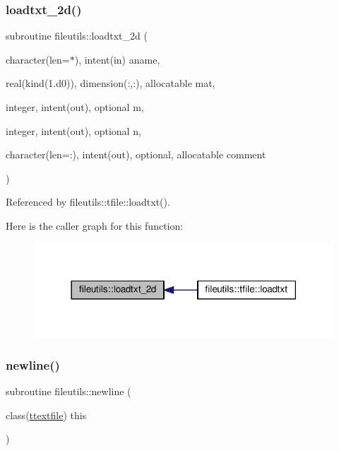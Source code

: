 \subsubsection{\texorpdfstring{loadtxt\+\_\+2d()}{loadtxt\_2d()}}
{\footnotesize\ttfamily subroutine fileutils\+::loadtxt\+\_\+2d (\begin{DoxyParamCaption}\item[{character(len=$\ast$), intent(in)}]{aname,  }\item[{real(kind(1.d0)), dimension(\+:,\+:), allocatable}]{mat,  }\item[{integer, intent(out), optional}]{m,  }\item[{integer, intent(out), optional}]{n,  }\item[{character(len=\+:), intent(out), optional, allocatable}]{comment }\end{DoxyParamCaption})\hspace{0.3cm}{\ttfamily [private]}}



Referenced by fileutils\+::tfile\+::loadtxt().

Here is the caller graph for this function\+:
\nopagebreak
\begin{figure}[H]
\begin{center}
\leavevmode
\includegraphics[width=318pt]{namespacefileutils_aefd4b6f83e21fff9ab97894279daaecb_icgraph}
\end{center}
\end{figure}
\mbox{\label{namespacefileutils_ae2a0937c572a3a07540ac002f8a620cd}} 
\subsubsection{\texorpdfstring{newline()}{newline()}}
{\footnotesize\ttfamily subroutine fileutils\+::newline (\begin{DoxyParamCaption}\item[{class(\mbox{\hyperlink{structfileutils_1_1ttextfile}{ttextfile}})}]{this }\end{DoxyParamCaption})\hspace{0.3cm}{\ttfamily [private]}}

